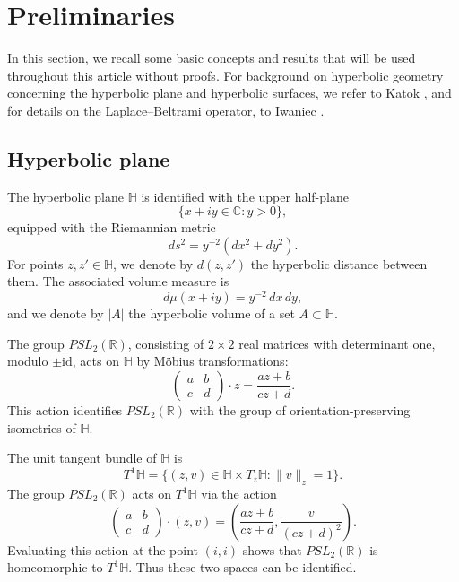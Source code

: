 \documentclass[11pt,twoside,reqno]{amsart} \usepackage{a4wide} \usepackage[T1]{fontenc} \usepackage[utf8]{inputenc} \usepackage{soul}  \usepackage{amsmath} \usepackage{amsfonts} \usepackage{amssymb} \usepackage{mathtools} \usepackage{amsthm} \usepackage{xcolor} \usepackage{graphicx} \usepackage{hyperref} \usepackage{standalone} \usepackage{esint} \usepackage{comment} \usepackage[left=2.3cm,top=3cm,right=2.3cm]{geometry} \usepackage{bm} \usepackage{svg} \usepackage{float} \numberwithin{equation}{section} \theoremstyle{plain} \newtheorem{thm}{Theorem}[section] \newtheorem{theorem}[thm]{Theorem} \newtheorem*{theorem*}{Theorem}\newtheorem{conj}[thm]{Conjecture} \newtheorem{lemma}[thm]{Lemma} \newtheorem{prop}[thm]{Proposition} \newtheorem{proposition}[thm]{Proposition} \newtheorem{cor}[thm]{Corollary} \newtheorem{question}[thm]{Question} \newtheorem{corollary}[thm]{Corollary} \newtheorem{assumption}[thm]{Assumption} \theoremstyle{definition} \newtheorem{defn}[thm]{Definition} \newtheorem{choice}[thm]{Choice} \newtheorem{definition}[thm]{Definition} \newtheorem{ex}[thm]{Example} \newtheorem{notation}[thm]{Notation} \newtheorem*{ack}{Acknowledgements} \theoremstyle{remark} \newtheorem{remark}[thm]{Remark} \newtheorem{bigremark}[thm]{Remark} \usepackage{xcolor} \newcommand{\red}[1]{ {\color{Red}#1} } \newcommand{\blue}[1]{ {\color{Blue}#1} } \author{Kai Hippi} \address{Aalto University, Espoo, Finland} \email{kai.hippi@aalto.fi}
\begin{document}

\section{Preliminaries}

\noindent
In this section, we recall some basic concepts and results that will be used throughout this article without proofs. For background on hyperbolic geometry concerning the hyperbolic plane and hyperbolic surfaces, we refer to Katok \cite{Kat92}, and for details on the Laplace--Beltrami operator, to Iwaniec \cite{Iwa02}.

\subsection{Hyperbolic plane}

The hyperbolic plane \( \mathbb{H} \) is identified with the upper half-plane
\[
    \{ x + i y \in \mathbb{C} : y > 0 \},
\]
equipped with the Riemannian metric
\[
    ds^{2} = y^{-2}(dx^{2} + dy^{2}).
\]
For points \( z, z' \in \mathbb{H} \), we denote by \( d(z, z') \) the hyperbolic distance between them. The associated volume measure is
\[
    d\mu(x + i y) = y^{-2} \, dx \, dy,
\]
and we denote by \( |A| \) the hyperbolic volume of a set \( A \subset \mathbb{H} \).

The group \( PSL_{2}(\mathbb{R}) \), consisting of \( 2 \times 2 \) real matrices with determinant one, modulo \( \pm \mathrm{id} \), acts on \( \mathbb{H} \) by Möbius transformations:
\[
    \begin{pmatrix} a & b \\ c & d \end{pmatrix} \cdot z = \frac{a z + b}{c z + d}.
\]
This action identifies \( PSL_{2}(\mathbb{R}) \) with the group of orientation-preserving isometries of \( \mathbb{H} \).

The unit tangent bundle of \( \mathbb{H} \) is
\[
    T^{1}\mathbb{H} = \{ (z, v) \in \mathbb{H} \times T_{z}\mathbb{H} : \|v\|_{z} = 1 \}.
\]
The group \( PSL_{2}(\mathbb{R}) \) acts on \( T^{1}\mathbb{H} \) via the action
\[
    \begin{pmatrix} a & b \\ c & d \end{pmatrix} \cdot (z, v)
    = \left( \frac{a z + b}{c z + d}, \frac{v}{(c z + d)^{2}} \right).
\]
Evaluating this action at the point \( (i, i) \) shows that \( PSL_{2}(\mathbb{R}) \) is homeomorphic to \( T^{1}\mathbb{H} \). Thus these two spaces can be identified.
\end{document}
